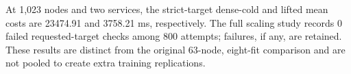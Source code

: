 At 1,023 nodes and two services, the strict-target dense-cold and lifted mean costs are 23474.91 and 3758.21 ms, respectively. The full scaling study records 0 failed requested-target checks among 800 attempts; failures, if any, are retained. These results are distinct from the original 63-node, eight-fit comparison and are not pooled to create extra training replications.

